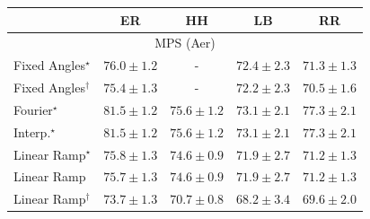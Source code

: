 \begin{tabular}{l|cccc|}
\toprule
            & ER & HH & LB & RR \\
\midrule
\multicolumn{5}{c}{\rule{0pt}{8pt}MPS (Aer)} \\
\midrule
Fixed Angles$^\star$ & {\cellcolor[HTML]{8C69B0}} \color[HTML]{F1F1F1} $76.0\pm 1.2$ & {\cellcolor[HTML]{000000}} \color[HTML]{F1F1F1} {\cellcolor{white}} \color{black} - & {\cellcolor[HTML]{99B2D5}} \color[HTML]{000000} $72.4\pm 2.3$ & {\cellcolor[HTML]{A8C3DE}} \color[HTML]{000000} $71.3\pm 1.3$ \\
Fixed Angles$^\dagger$ & {\cellcolor[HTML]{8C76B7}} \color[HTML]{F1F1F1} $75.4\pm 1.3$ & {\cellcolor[HTML]{000000}} \color[HTML]{F1F1F1} {\cellcolor{white}} \color{black} - & {\cellcolor[HTML]{9BB6D7}} \color[HTML]{000000} $72.2\pm 2.3$ & {\cellcolor[HTML]{B4CCE2}} \color[HTML]{000000} $70.5\pm 1.6$ \\
Fourier$^\star$ & {\cellcolor[HTML]{580356}} \color[HTML]{F1F1F1} $81.5\pm 1.2$ & {\cellcolor[HTML]{8C72B5}} \color[HTML]{F1F1F1} $75.6\pm 1.2$ & {\cellcolor[HTML]{93A5CE}} \color[HTML]{F1F1F1} $73.1\pm 2.1$ & {\cellcolor[HTML]{894FA3}} \color[HTML]{F1F1F1} $77.3\pm 2.1$ \\
Interp.$^\star$ & {\cellcolor[HTML]{580356}} \color[HTML]{F1F1F1} $81.5\pm 1.2$ & {\cellcolor[HTML]{8C72B5}} \color[HTML]{F1F1F1} $75.6\pm 1.2$ & {\cellcolor[HTML]{93A5CE}} \color[HTML]{F1F1F1} $73.1\pm 2.1$ & {\cellcolor[HTML]{894FA3}} \color[HTML]{F1F1F1} $77.3\pm 2.1$ \\
Linear Ramp$^\star$ & {\cellcolor[HTML]{8C6DB2}} \color[HTML]{F1F1F1} $75.8\pm 1.3$ & {\cellcolor[HTML]{8C86BE}} \color[HTML]{F1F1F1} $74.6\pm 0.9$ & {\cellcolor[HTML]{9EBCDA}} \color[HTML]{000000} $71.9\pm 2.7$ & {\cellcolor[HTML]{A9C4DE}} \color[HTML]{000000} $71.2\pm 1.3$ \\
Linear Ramp & {\cellcolor[HTML]{8C70B3}} \color[HTML]{F1F1F1} $75.7\pm 1.3$ & {\cellcolor[HTML]{8C86BE}} \color[HTML]{F1F1F1} $74.6\pm 0.9$ & {\cellcolor[HTML]{9EBCDA}} \color[HTML]{000000} $71.9\pm 2.7$ & {\cellcolor[HTML]{A9C4DE}} \color[HTML]{000000} $71.2\pm 1.3$ \\
Linear Ramp$^\dagger$ & {\cellcolor[HTML]{8E9AC8}} \color[HTML]{F1F1F1} $73.7\pm 1.3$ & {\cellcolor[HTML]{B1C9E1}} \color[HTML]{000000} $70.7\pm 0.8$ & {\cellcolor[HTML]{DBE8F2}} \color[HTML]{000000} $68.2\pm 3.4$ & {\cellcolor[HTML]{C3D6E8}} \color[HTML]{000000} $69.6\pm 2.0$ \\

\end{tabular}
